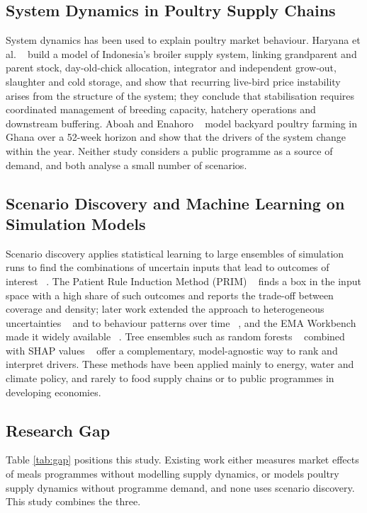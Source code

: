 \documentclass[10pt,twocolumn,a4paper]{article}
\begin{document}
\subsection{System Dynamics in Poultry Supply Chains}

System dynamics has been used to explain poultry market behaviour. Haryana et al. ~\cite{haryana2026} build a model of Indonesia's broiler supply system, linking grandparent and parent stock, day-old-chick allocation, integrator and independent grow-out, slaughter and cold storage, and show that recurring live-bird price instability arises from the structure of the system; they conclude that stabilisation requires coordinated management of breeding capacity, hatchery operations and downstream buffering. Aboah and Enahoro ~\cite{aboah2022} model backyard poultry farming in Ghana over a 52-week horizon and show that the drivers of the system change within the year. Neither study considers a public programme as a source of demand, and both analyse a small number of scenarios.


\subsection{Scenario Discovery and Machine Learning on Simulation Models}

Scenario discovery applies statistical learning to large ensembles of simulation runs to find the combinations of uncertain inputs that lead to outcomes of interest ~\cite{bryant2010}. The Patient Rule Induction Method (PRIM) ~\cite{friedman1999} finds a box in the input space with a high share of such outcomes and reports the trade-off between coverage and density; later work extended the approach to heterogeneous uncertainties ~\cite{kwakkel2016} and to behaviour patterns over time ~\cite{steinmann2020}, and the EMA Workbench made it widely available ~\cite{kwakkel2017}. Tree ensembles such as random forests ~\cite{breiman2001} combined with SHAP values ~\cite{lundberg2017} offer a complementary, model-agnostic way to rank and interpret drivers. These methods have been applied mainly to energy, water and climate policy, and rarely to food supply chains or to public programmes in developing economies.


\subsection{Research Gap}

Table \ref{tab:gap} positions this study. Existing work either measures market effects of meals programmes without modelling supply dynamics, or models poultry supply dynamics without programme demand, and none uses scenario discovery. This study combines the three.
\end{document}
